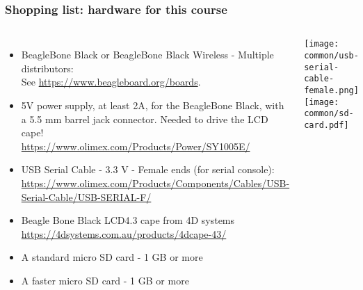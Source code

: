 \begin{frame}
\frametitle{Shopping list: hardware for this course}
  \begin{columns}
    \begin{itemize}
      \item BeagleBone Black or BeagleBone Black Wireless - Multiple distributors: \\
            See \url{https://www.beagleboard.org/boards}.
      \item 5V power supply, at least 2A, for the BeagleBone Black, with a 5.5 mm barrel
            jack connector. Needed to drive the LCD cape!\\
            \url{https://www.olimex.com/Products/Power/SY1005E/}
      \item USB Serial Cable - 3.3 V - Female ends (for serial console): \\
            \url{https://www.olimex.com/Products/Components/Cables/USB-Serial-Cable/USB-SERIAL-F/}
      \item Beagle Bone Black LCD4.3 cape from 4D systems\\
            \url{https://4dsystems.com.au/products/4dcape-43/}
      \item A standard micro SD card - 1 GB or more
      \item A faster micro SD card - 1 GB or more
    \end{itemize}
    \texttt{[image: common/usb-serial-cable-female.png]} \\
    \texttt{[image: common/sd-card.pdf]} \\
  \end{columns}
\end{frame}
